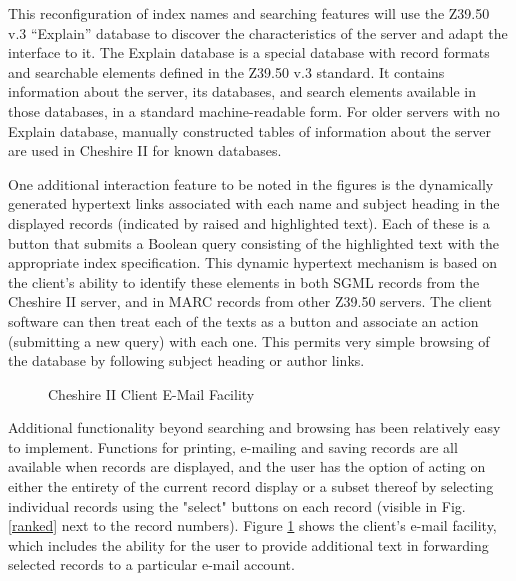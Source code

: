 This reconfiguration of index names and searching features will use
the Z39.50 v.3 ``Explain'' database to discover the characteristics of
the server and adapt the interface to it.  The Explain database is a
special database with record formats and searchable elements defined
in the Z39.50 v.3 standard\cite{ANSI,LYNCH}. It contains information about
the server, its databases, and search elements available in those
databases, in a standard machine-readable form. For older servers with
no Explain database, manually constructed tables of information about
the server are used in Cheshire II for known databases.

One additional interaction feature to be noted in the figures is the
dynamically generated hypertext links associated with each name and
subject heading in the displayed records (indicated by raised and 
highlighted text). Each of these is a button that submits a
Boolean query consisting of the highlighted text with the appropriate
index specification. This dynamic hypertext mechanism is based on the
client's ability to identify these elements in both SGML records from
the Cheshire II server, and in MARC records from other Z39.50 servers.
The client software can then treat each of the texts as a button and
associate an action (submitting a new query) with each one. This permits
very simple browsing of the database by following subject heading or
author links. 

\begin{figure}[t]
\begin{center}
\caption{Cheshire II Client E-Mail Facility}
\label{email}
\end{center}
\end{figure}

Additional functionality beyond searching and browsing has been
relatively easy to implement.  Functions for printing, e-mailing and
saving records are all available when records are displayed, and the
user has the option of acting on either the entirety of the current
record display or a subset thereof by selecting individual records
using the "select" buttons on each record (visible in
Fig. \ref{ranked} next to the record numbers).  Figure \ref{email}
shows the client's e-mail facility, which includes the ability for the
user to provide additional text in forwarding selected records to a
particular e-mail account.

